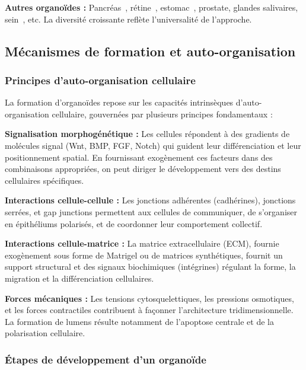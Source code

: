 \textbf{Autres organoïdes :}
Pancréas~\cite{Boj2015}, rétine~\cite{Lin2020}, estomac~\cite{Bartfeld2015}, prostate, glandes salivaires, sein~\cite{Sachs2018}, etc. La diversité croissante reflète l'universalité de l'approche.

\subsection{Mécanismes de formation et auto-organisation}

\subsubsection{Principes d'auto-organisation cellulaire}

La formation d'organoïdes repose sur les capacités intrinsèques d'auto-organisation cellulaire, gouvernées par plusieurs principes fondamentaux :

\textbf{Signalisation morphogénétique :}
Les cellules répondent à des gradients de molécules signal (Wnt, BMP, FGF, Notch) qui guident leur différenciation et leur positionnement spatial. En fournissant exogènement ces facteurs dans des combinaisons appropriées, on peut diriger le développement vers des destins cellulaires spécifiques.

\textbf{Interactions cellule-cellule :}
Les jonctions adhérentes (cadhérines), jonctions serrées, et gap junctions permettent aux cellules de communiquer, de s'organiser en épithéliums polarisés, et de coordonner leur comportement collectif.

\textbf{Interactions cellule-matrice :}
La matrice extracellulaire (ECM), fournie exogènement sous forme de Matrigel ou de matrices synthétiques, fournit un support structural et des signaux biochimiques (intégrines) régulant la forme, la migration et la différenciation cellulaires.

\textbf{Forces mécaniques :}
Les tensions cytosquelettiques, les pressions osmotiques, et les forces contractiles contribuent à façonner l'architecture tridimensionnelle. La formation de lumens résulte notamment de l'apoptose centrale et de la polarisation cellulaire.

\subsubsection{Étapes de développement d'un organoïde}


